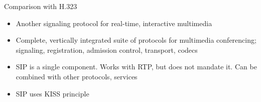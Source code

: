 \begin{note}{Comparison with H.323}
	\begin{itemize}
		\item Another signaling protocol for real-time, interactive multimedia
		\item Complete, vertically integrated suite of protocols for multimedia conferencing; signaling, registration, admission control, transport, codecs
		\item SIP is a single component. Works with RTP, but does not mandate it. Can be combined with other protocols, services
		\item SIP uses KISS principle
	\end{itemize}
\end{note}